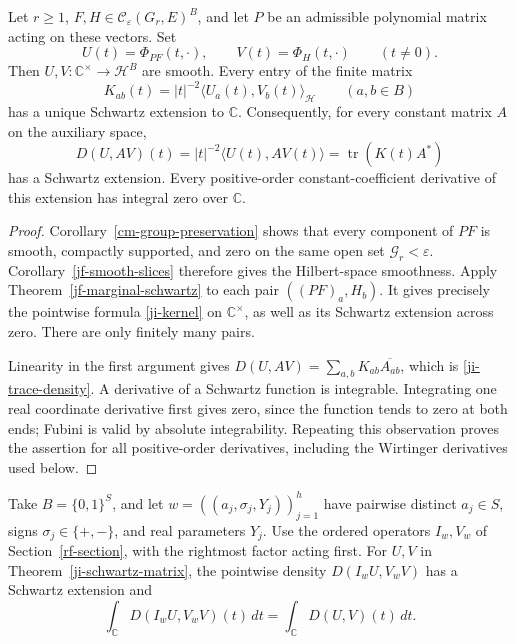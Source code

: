 \begin{theorem}\label{ji-schwartz-matrix}
Let \(r\geq1\), \(F,H\in\mathscr C_\varepsilon(G_r,E)^B\), and let
\(P\) be an admissible polynomial matrix acting on these vectors.
Set
\[
 U(t)=\Phi_{PF}(t,\cdot),\qquad
 V(t)=\Phi_H(t,\cdot)\qquad(t\ne0).
\]
Then \(U,V:\mathbb C^\times\to\mathcal H^B\) are smooth.
Every entry of the finite matrix
\begin{equation}\label{ji-kernel}
 K_{ab}(t)=|t|^{-2}\langle U_a(t),V_b(t)\rangle_{\mathcal H}
 \qquad(a,b\in B)
\end{equation}
has a unique Schwartz extension to \(\mathbb C\).
Consequently, for every constant matrix \(A\) on the auxiliary
space,
\begin{equation}\label{ji-trace-density}
 D(U,AV)(t)=|t|^{-2}\langle U(t),AV(t)\rangle
                         =\operatorname{tr}(K(t)A^*)
\end{equation}
has a Schwartz extension.  Every positive-order constant-coefficient
derivative of this extension has integral zero over \(\mathbb C\).
\end{theorem}

\begin{proof}
Corollary~\ref{cm-group-preservation} shows that every component of
\(PF\) is smooth, compactly supported, and zero on the same open
set \(\mathcal G_r<\varepsilon\).  Corollary~\ref{jf-smooth-slices}
therefore gives the Hilbert-space smoothness.  Apply
Theorem~\ref{jf-marginal-schwartz} to each pair
\(((PF)_a,H_b)\).  It gives precisely the pointwise formula
\eqref{ji-kernel} on \(\mathbb C^\times\), as well as its Schwartz
extension across zero.  There are only finitely many pairs.

Linearity in the first argument gives
\(D(U,AV)=\sum_{a,b}K_{ab}\overline{A_{ab}}\), which is
\eqref{ji-trace-density}.  A derivative of a Schwartz function is
integrable.  Integrating one real coordinate derivative first gives
zero, since the function tends to zero at both ends; Fubini is
valid by absolute integrability.  Repeating this observation proves
the assertion for all positive-order derivatives, including the
Wirtinger derivatives used below.
\end{proof}

\begin{corollary}\label{ji-integrated-word}
Take \(B=\{0,1\}^S\), and let
\(w=((a_j,\sigma_j,Y_j))_{j=1}^h\) have pairwise distinct
\(a_j\in S\), signs \(\sigma_j\in\{+,-\}\), and real
parameters \(Y_j\).  Use the ordered operators \(I_w,V_w\)
of Section~\ref{rf-section}, with the rightmost factor acting first.
For \(U,V\) in Theorem~\ref{ji-schwartz-matrix}, the pointwise
density \(D(I_wU,V_wV)\) has a Schwartz extension and
\begin{equation}\label{ji-integrated-identity}
 \int_{\mathbb C}D(I_wU,V_wV)(t)\,dt
                         =\int_{\mathbb C}D(U,V)(t)\,dt.
\end{equation}
\end{corollary}


